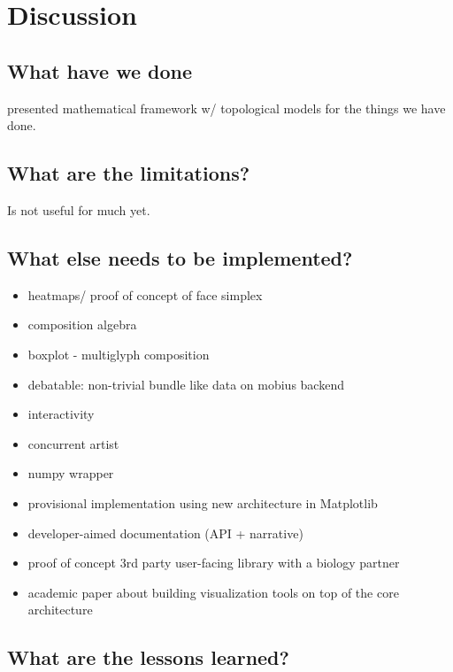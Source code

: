 \documentclass[../main.tex]{subfiles}
\begin{document}
\section{Discussion}

\subsection{What have we done}
presented mathematical framework w/ topological models for the things we have done. 
\subsection{What are the limitations?}
Is not useful for much yet.

\subsection{What else needs to be implemented?}
\begin{itemize}
    \item heatmaps/ proof of concept of face simplex
    \item composition algebra
    \item boxplot - multiglyph composition
    \item debatable: non-trivial bundle like data on mobius backend
    \item interactivity 
    \item concurrent artist
    \item numpy wrapper
\end{itemize}
\begin{itemize}
    \item provisional implementation using new architecture in Matplotlib
    \item developer-aimed documentation (API + narrative)
    \item proof of concept 3rd party user-facing library with a biology partner
    \item academic paper about building visualization tools on top of the core architecture
\end{itemize}

\subsection{What are the lessons learned?}
\end{document}
